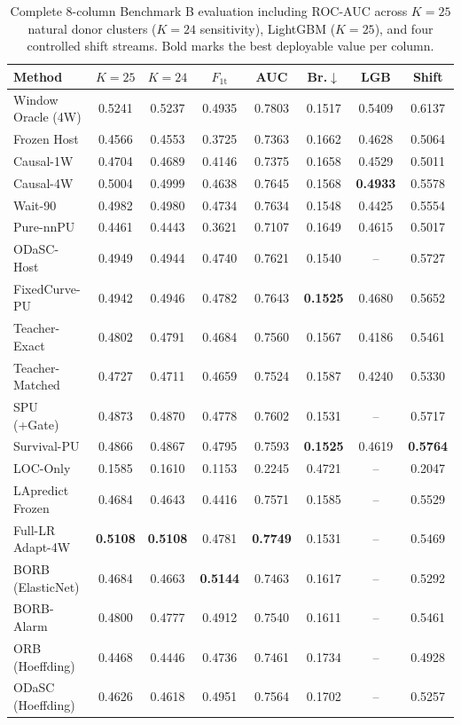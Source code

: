 \documentclass[10pt,a4paper]{article}
\begin{document}
\begin{table}[!htbp]
\centering
\caption{Complete 8-column Benchmark B evaluation including ROC-AUC across $K=25$ natural donor clusters ($K=24$ sensitivity), LightGBM ($K=25$), and four controlled shift streams. Bold marks the best deployable value per column.}
\label{tab:or_bench_b_full}
\fontsize{7.5}{9.0}\selectfont
\setlength{\tabcolsep}{2.2pt}
\begin{tabular*}{\textwidth}{@{\extracolsep\fill}lccccccc@{}}
\toprule
\textbf{Method} & \textbf{$K{=}25$} & \textbf{$K{=}24$} & \textbf{$F_{1\mathrm{t}}$} & \textbf{AUC} & \textbf{Br.$\downarrow$} & \textbf{LGB} & \textbf{Shift} \\
\midrule
Window Oracle (4W) & 0.5241 & 0.5237 & 0.4935 & 0.7803 & 0.1517 & 0.5409 & 0.6137 \\
\midrule
Frozen Host & 0.4566 & 0.4553 & 0.3725 & 0.7363 & 0.1662 & 0.4628 & 0.5064 \\
Causal-1W & 0.4704 & 0.4689 & 0.4146 & 0.7375 & 0.1658 & 0.4529 & 0.5011 \\
Causal-4W & 0.5004 & 0.4999 & 0.4638 & 0.7645 & 0.1568 & \textbf{0.4933} & 0.5578 \\
Wait-90 & 0.4982 & 0.4980 & 0.4734 & 0.7634 & 0.1548 & 0.4425 & 0.5554 \\
Pure-nnPU & 0.4461 & 0.4443 & 0.3621 & 0.7107 & 0.1649 & 0.4615 & 0.5017 \\
ODaSC-Host & 0.4949 & 0.4944 & 0.4740 & 0.7621 & 0.1540 & -- & 0.5727 \\
FixedCurve-PU & 0.4942 & 0.4946 & 0.4782 & 0.7643 & \textbf{0.1525} & 0.4680 & 0.5652 \\
Teacher-Exact & 0.4802 & 0.4791 & 0.4684 & 0.7560 & 0.1567 & 0.4186 & 0.5461 \\
Teacher-Matched & 0.4727 & 0.4711 & 0.4659 & 0.7524 & 0.1587 & 0.4240 & 0.5330 \\
SPU (+Gate) & 0.4873 & 0.4870 & 0.4778 & 0.7602 & 0.1531 & -- & 0.5717 \\
Survival-PU & 0.4866 & 0.4867 & 0.4795 & 0.7593 & \textbf{0.1525} & 0.4619 & \textbf{0.5764} \\
\midrule
LOC-Only & 0.1585 & 0.1610 & 0.1153 & 0.2245 & 0.4721 & -- & 0.2047 \\
LApredict Frozen & 0.4684 & 0.4643 & 0.4416 & 0.7571 & 0.1585 & -- & 0.5529 \\
Full-LR Adapt-4W & \textbf{0.5108} & \textbf{0.5108} & 0.4781 & \textbf{0.7749} & 0.1531 & -- & 0.5469 \\
BORB (ElasticNet) & 0.4684 & 0.4663 & \textbf{0.5144} & 0.7463 & 0.1617 & -- & 0.5292 \\
BORB-Alarm & 0.4800 & 0.4777 & 0.4912 & 0.7540 & 0.1611 & -- & 0.5461 \\
ORB (Hoeffding) & 0.4468 & 0.4446 & 0.4736 & 0.7461 & 0.1734 & -- & 0.4928 \\
ODaSC (Hoeffding) & 0.4626 & 0.4618 & 0.4951 & 0.7564 & 0.1702 & -- & 0.5257 \\
\bottomrule
\end{tabular*}
\end{table}
\end{document}
